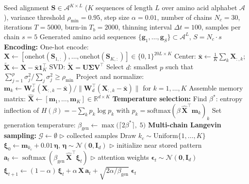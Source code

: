 \begin{algorithm}[ht]
\caption{Stochastic Attention Protein Sequence Generation}\label{alg:sa-pipeline}
\begin{algorithmic}[1]
\REQUIRE Seed alignment $\mathbf{S} \in \mathcal{A}^{K \times L}$ ($K$ sequences of length $L$ over amino acid alphabet $\mathcal{A}$), variance threshold $\rho_{\min} = 0.95$, step size $\alpha = 0.01$, number of chains $N_c = 30$, iterations $T = 5000$, burn-in $T_b = 2000$, thinning interval $\Delta t = 100$, samples per chain $s = 5$
\ENSURE Generated amino acid sequences $\{\mathbf{g}_1, \ldots, \mathbf{g}_S\} \subset \mathcal{A}^L$, \; $S = N_c \cdot s$
\STATE \textbf{Encoding:}
\STATE One-hot encode: $\mathbf{X} \leftarrow [\mathrm{onehot}(\mathbf{S}_{1,:}), \ldots, \mathrm{onehot}(\mathbf{S}_{K,:})] \in \{0,1\}^{20L \times K}$
\STATE Center: $\bar{\mathbf{x}} \leftarrow \frac{1}{K}\sum_k \mathbf{X}_{:,k}$; \; $\tilde{\mathbf{X}} \leftarrow \mathbf{X} - \bar{\mathbf{x}}\mathbf{1}_K^\top$
\STATE SVD: $\tilde{\mathbf{X}} = \mathbf{U}\boldsymbol{\Sigma}\mathbf{V}^\top$
\STATE Select $d$: smallest $p$ such that $\sum_{j=1}^{p}\sigma_j^2 / \sum_j \sigma_j^2 \geq \rho_{\min}$
\STATE Project and normalize: $\mathbf{m}_k \leftarrow \mathbf{W}_d^\top(\mathbf{X}_{:,k} - \bar{\mathbf{x}}) / \|\mathbf{W}_d^\top(\mathbf{X}_{:,k} - \bar{\mathbf{x}})\|$ \; for $k = 1,\ldots,K$
\STATE Assemble memory matrix: $\hat{\mathbf{X}} \leftarrow [\mathbf{m}_1, \ldots, \mathbf{m}_K] \in \mathbb{R}^{d \times K}$
\STATE \textbf{Temperature selection:}
\STATE Find $\beta^*$: entropy inflection of $H(\beta) = -\sum_k p_k \log p_k$ with $p_k = \mathrm{softmax}(\beta\,\hat{\mathbf{X}}^\top\mathbf{m}_k)_k$
\STATE Set generation temperature: $\beta_{\mathrm{gen}} \leftarrow \max\!\bigl(\lceil 2\beta^* \rceil,\; 5\bigr)$
\STATE \textbf{Multi-chain Langevin sampling:}
\STATE $\mathcal{G} \leftarrow \emptyset$ \hfill $\triangleright$ collected samples
    \STATE Draw $k_c \sim \mathrm{Uniform}\{1,\ldots,K\}$
    \STATE $\boldsymbol{\xi}_0 \leftarrow \mathbf{m}_{k_c} + 0.01\,\boldsymbol{\eta}$, \; $\boldsymbol{\eta} \sim \mathcal{N}(\mathbf{0}, \mathbf{I}_d)$ \hfill $\triangleright$ initialize near stored pattern
        \STATE $\mathbf{a}_t \leftarrow \operatorname{softmax}(\beta_{\mathrm{gen}}\,\hat{\mathbf{X}}^\top\boldsymbol{\xi}_t)$ \hfill $\triangleright$ attention weights
        \STATE $\boldsymbol{\epsilon}_t \sim \mathcal{N}(\mathbf{0}, \mathbf{I}_d)$
        \STATE $\boldsymbol{\xi}_{t+1} \leftarrow (1-\alpha)\,\boldsymbol{\xi}_t + \alpha\,\hat{\mathbf{X}}\,\mathbf{a}_t + \sqrt{2\alpha/\beta_{\mathrm{gen}}}\;\boldsymbol{\epsilon}_t$

\end{algorithmic}
\end{algorithm}

